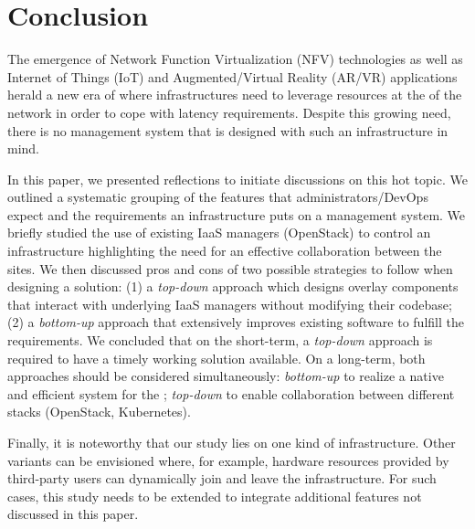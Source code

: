 \section{Conclusion}
\label{sec:conclusion}

The emergence of Network Function Virtualization (NFV) technologies as
well as Internet of Things (IoT) and Augmented/Virtual Reality (AR/VR)
applications herald a new era of \cloudcomputing where infrastructures
need to leverage resources at the \edge of the network in order to cope
with latency requirements.  Despite this growing need, there is no
\cloud management system that is designed with such an infrastructure
in mind.

In this paper, we presented reflections to initiate discussions on this
hot topic. 
We outlined a systematic grouping of the features that administrators/DevOps
expect and the requirements an \edge infrastructure puts on a \cloud management
system.
We briefly studied the use of existing IaaS managers (\ie OpenStack)
to control an \edge infrastructure highlighting the need for an
effective collaboration between the \edge sites.  
We then discussed pros and cons of two possible strategies to follow when
designing a solution: (1) a \emph{top-down} approach which designs overlay
components that interact with underlying IaaS managers without modifying their
codebase; (2) a \emph{bottom-up} approach that extensively
improves existing software to fulfill the requirements. We concluded
that on the short-term, a \emph{top-down} approach is required to have
a timely working solution available. On a long-term, both approaches should be
considered simultaneously: \emph{bottom-up} to realize a native and efficient
system for the \edge; \emph{top-down} to enable collaboration between different
\cloud stacks (\eg OpenStack, Kubernetes).

Finally, it is noteworthy that our study lies on one kind of \edge
infrastructure. Other variants can be envisioned where, for example,
hardware resources provided by third-party users can dynamically join
and leave the infrastructure. For such cases, this study needs to be
extended to integrate additional features not discussed in this paper.

